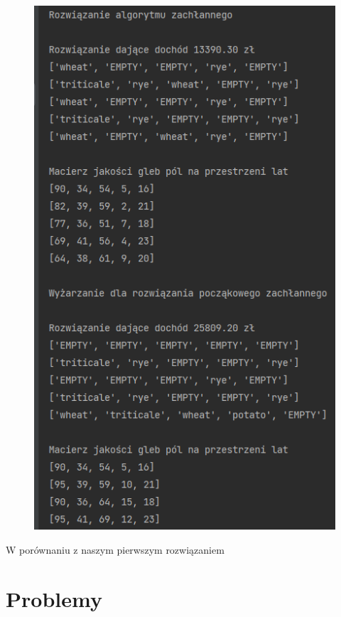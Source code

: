 \documentclass[12pt,a4paper]{article}
\begin{document}
\begin{figure}[H]
	\centering
	\includegraphics[width=1\linewidth]{screens/mamos_rozw}
	\caption{}
	\label{fig:mamosrozw}
\end{figure}

W porównaniu z naszym pierwszym rozwiązaniem 

\section{Problemy}
	
\end{document}

